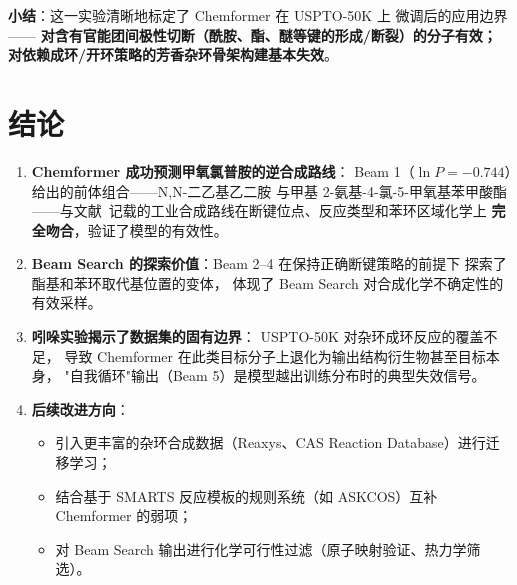 \documentclass[a4paper, 12pt]{article}
\begin{document}
\textbf{小结}：这一实验清晰地标定了 Chemformer 在 USPTO-50K 上
微调后的应用边界——
\textbf{对含有官能团间极性切断（酰胺、酯、醚等键的形成/断裂）的分子有效；
对依赖成环/开环策略的芳香杂环骨架构建基本失效}。

\section{结论}

\begin{enumerate}[leftmargin=2em]
  \item \textbf{Chemformer 成功预测甲氧氯普胺的逆合成路线}：
        Beam 1（$\ln P=-0.744$）给出的前体组合——N,N-二乙基乙二胺
        与甲基 2-氨基-4-氯-5-甲氧基苯甲酸酯——与文献\,\cite{cpb1971}
        记载的工业合成路线在断键位点、反应类型和苯环区域化学上
        \textbf{完全吻合}，验证了模型的有效性。

  \item \textbf{Beam Search 的探索价值}：Beam 2--4 在保持正确断键策略的前提下
        探索了酯基和苯环取代基位置的变体，
        体现了 Beam Search 对合成化学不确定性的有效采样。

  \item \textbf{吲哚实验揭示了数据集的固有边界}：
        USPTO-50K 对杂环成环反应的覆盖不足，
        导致 Chemformer 在此类目标分子上退化为输出结构衍生物甚至目标本身，
        "自我循环"输出（Beam 5）是模型越出训练分布时的典型失效信号。

  \item \textbf{后续改进方向}：
        \begin{itemize}[leftmargin=2em]
          \item 引入更丰富的杂环合成数据（Reaxys、CAS Reaction Database）进行迁移学习；
          \item 结合基于 SMARTS 反应模板的规则系统（如 ASKCOS）互补 Chemformer 的弱项；
          \item 对 Beam Search 输出进行化学可行性过滤（原子映射验证、热力学筛选）。
        \end{itemize}
\end{enumerate}
\end{document}
